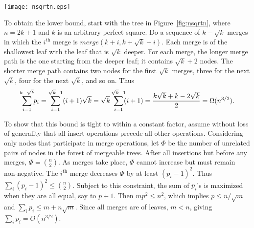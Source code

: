 \documentclass[twoside,leqno,twocolumn]{article}
\newcommand{\merge}{\mathit{merge}}
\begin{document}
\begin{figure*}
\addtolength{\abovecaptionskip}{-.5cm}
\begin{center}
\resizebox{0.30\textwidth}{!} {\texttt{[image: nsqrtn.eps]}}
\end{center}
\caption{\label{fig:nsqrtn}
Initial tree for a sequence of merges whose shorter merge paths have $\Omega(n^{3/2})$ nodes.  The $i^\mathrm{th}$ merge is of the shallowest leaf and the leaf that is $\sqrt{k}$ deeper.}
\end{figure*}

To obtain the lower bound, start with the tree in Figure~\ref{fig:nsqrtn}, where $n = 2k + 1$ and $k$ is an arbitrary perfect square.  Do a sequence of $k - \sqrt{k}$ merges in which the $i^\mathrm{th}$ merge is $\merge(k + i, k + \sqrt{k} + i)$.  Each merge is of the shallowest leaf with the leaf that is $\sqrt{k}$ deeper.  For each merge, the longer merge path is the one starting from the deeper leaf; it contains $\sqrt{k} + 2$ nodes.  The shorter merge path contains two nodes for the first $\sqrt{k}$ merges, three for the next $\sqrt{k}$, four for the next $\sqrt{k}$, and so on.  Thus
\vspace{-.1cm}
\[
\sum_{i=1}^{k - \sqrt{k}} \hspace{-.1cm} p_i
= \sum_{i = 1}^{\sqrt{k} - 1} (i+1) \sqrt{k}
= \sqrt{k} \sum_{i = 1}^{\sqrt{k} - 1} \hspace{-.1cm} (i+1)
= \frac{k\sqrt{k} + k - 2\sqrt{k}}{2}
= \Omega(n^{3/2}).
\]

To show that this bound is tight to within a constant factor, assume without loss of generality that all insert operations precede all other operations.  Considering only nodes that participate in merge operations, let $\Phi$ be the number of unrelated pairs of nodes in the forest of mergeable trees.  After all insertions but before any merges, $\Phi = {n \choose 2}$.  As merges take place, $\Phi$ cannot increase but must remain non-negative.  The $i^\mathrm{th}$ merge decreases $\Phi$ by at least $(p_i - 1)^2$.  Thus $\sum_i (p_i - 1)^2 \le {n \choose 2}$.  Subject to this constraint, the sum of $p_i$'s is maximized when they are all equal, say to $p + 1$.  Then $mp^2 \le n^2$, which implies $p \le n/\sqrt{m}$ and $\sum_i p_i \le m + n \sqrt{m}$.  Since all merges are of leaves, $m < n$, giving $\sum_i p_i = O(n^{3/2})$.
\end{document}
